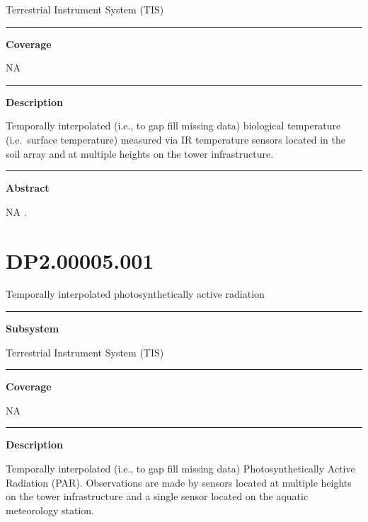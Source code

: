 \documentclass[]{article}
\begin{document}
Terrestrial Instrument System (TIS)

\begin{center}\rule{0.5\linewidth}{\linethickness}\end{center}

\textbf{Coverage}

NA

\begin{center}\rule{0.5\linewidth}{\linethickness}\end{center}

\textbf{Description}

Temporally interpolated (i.e., to gap fill missing data) biological
temperature (i.e.~surface temperature) measured via IR temperature
sensors located in the soil array and at multiple heights on the tower
infrastructure.

\begin{center}\rule{0.5\linewidth}{\linethickness}\end{center}

\textbf{Abstract}

NA \newpage
.

\section{DP2.00005.001}\label{dp2.00005.001}

Temporally interpolated photosynthetically active radiation

\begin{center}\rule{0.5\linewidth}{\linethickness}\end{center}

\textbf{Subsystem}

Terrestrial Instrument System (TIS)

\begin{center}\rule{0.5\linewidth}{\linethickness}\end{center}

\textbf{Coverage}

NA

\begin{center}\rule{0.5\linewidth}{\linethickness}\end{center}

\textbf{Description}

Temporally interpolated (i.e., to gap fill missing data)
Photosynthetically Active Radiation (PAR). Observations are made by
sensors located at multiple heights on the tower infrastructure and a
single sensor located on the aquatic meteorology station.
\end{document}
